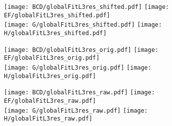 \documentclass[landscape,10pt]{beamer} %
\begin{document}
\newpage

\begin{figure}[p]
\centering
  \texttt{[image: BCD/globalFitL3res\_shifted.pdf]}
  \texttt{[image: EF/globalFitL3res\_shifted.pdf]}\\
  \texttt{[image: G/globalFitL3res\_shifted.pdf]}
  \texttt{[image: H/globalFitL3res\_shifted.pdf]}
\end{figure}

\newpage

\begin{figure}[p]
\centering
  \texttt{[image: BCD/globalFitL3res\_orig.pdf]}
  \texttt{[image: EF/globalFitL3res\_orig.pdf]}\\
  \texttt{[image: G/globalFitL3res\_orig.pdf]}
  \texttt{[image: H/globalFitL3res\_orig.pdf]}
\end{figure}

\newpage

\begin{figure}[p]
\centering
  \texttt{[image: BCD/globalFitL3res\_raw.pdf]}
  \texttt{[image: EF/globalFitL3res\_raw.pdf]}\\
  \texttt{[image: G/globalFitL3res\_raw.pdf]}
  \texttt{[image: H/globalFitL3res\_raw.pdf]}
\end{figure}
\end{document}

